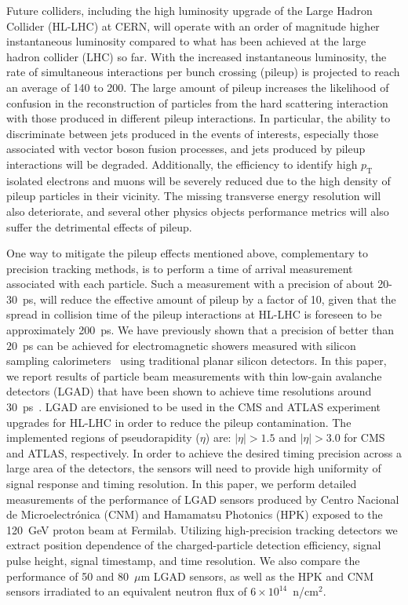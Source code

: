 \documentclass[preprint,1p]{elsarticle}
\begin{document}
Future colliders, including the high luminosity upgrade of the Large Hadron
Collider (HL-LHC) at CERN, will operate with an order of magnitude higher
instantaneous luminosity compared to what has been achieved at the
large hadron collider (LHC) so far.
With the increased instantaneous luminosity, the rate of simultaneous
interactions per bunch crossing (pileup) is projected to reach an average of 140
to 200. The large amount of pileup increases the likelihood of confusion in the
reconstruction of particles from the hard scattering interaction with those
produced in different pileup interactions. In particular, the ability to discriminate between
jets produced in the events of interests, especially those associated with vector boson fusion processes, and jets produced by pileup interactions will be
degraded. Additionally, the efficiency to identify high $p_{\mathrm{T}}$ isolated electrons
and muons will be severely reduced due to the high density of pileup particles
in their vicinity. The missing transverse energy resolution will also deteriorate, and several
other physics objects performance metrics will also suffer the
detrimental effects of pileup.


One way to mitigate the pileup effects mentioned above, complementary to precision
tracking methods, is to perform a time of arrival measurement associated with
each particle. Such a measurement with a precision of about 20-30~\si{ps}, will
reduce the effective amount of pileup by a factor of 10, given that the spread
in collision time of the pileup interactions at HL-LHC is foreseen to be
approximately 200~\si{ps}. We have previously shown that a precision of better than
$20$~\si{ps} can be achieved for electromagnetic showers measured with silicon
sampling calorimeters~\cite{Apresyan201662,Apresyan2017_NSSMIC,AKCHURIN201731}
using traditional planar silicon detectors. In this paper, we report results of
particle beam measurements with thin low-gain avalanche detectors (LGAD) that have
been shown to achieve time resolutions around 30~\si{ps}~\cite{Cartiglia201783}. LGAD
are envisioned to be used in the CMS and ATLAS experiment upgrades for HL-LHC in
order to reduce the pileup contamination. The implemented regions of
pseudorapidity ($\eta$) are:
$|\eta|>1.5$ and $|\eta|>3.0$ for CMS and ATLAS, respectively. In order to achieve
the desired timing precision across a large area of the detectors, the
sensors will need to provide high uniformity of signal response and timing
resolution. In this paper, we perform detailed measurements of the performance of
LGAD sensors produced by Centro Nacional de Microelectr\'{o}nica (CNM) and
Hamamatsu Photonics (HPK) exposed to the 120~GeV proton beam at Fermilab.
Utilizing high-precision tracking detectors we extract position dependence of
the charged-particle detection efficiency, signal pulse height, signal
timestamp, and time resolution. We also compare the performance of 
50 and 80~$\mu$m LGAD sensors, as well as the HPK and CNM sensors irradiated to 
an equivalent neutron flux of $6\times 10^{14}$~n/cm$^2$.
\end{document}
